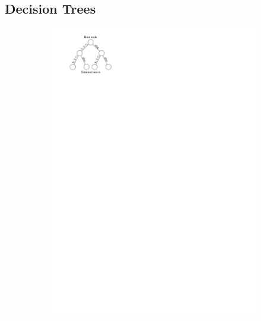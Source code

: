 \subsection{Decision Trees}
\label{sec:ml_decision_trees}

\begin{figure}[htb]
  \centering
  \begin{subfigure}[t]{0.4\textwidth}
    \centering
    \includegraphics{./figures/theory/decision_tree.pdf}
    \label{fig:decision_tree_binary_tree}
  \end{subfigure}\hspace*{2em}
  \begin{subfigure}[t]{0.4\textwidth}
    \centering

\end{subfigure}
\end{figure}
